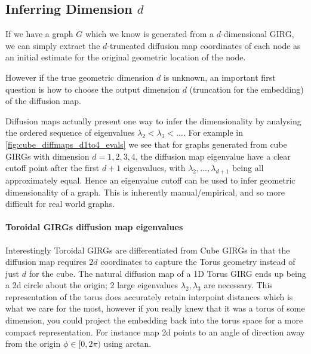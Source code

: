 \subsection{Inferring Dimension $d$}
If we have a graph $G$ which we know is generated from a $d$-dimensional GIRG, we can simply extract the $d$-truncated diffusion map coordinates of each node as an initial estimate for the original geometric location of the node. 

However if the true geometric dimension $d$ is unknown, an important first question is how to choose the output dimension $d$ (truncation for the embedding) of the diffusion map.

Diffusion maps actually present one way to infer the dimensionality by analysing the ordered sequence of eigenvalues $\lambda_2 < \lambda_3 < ...$. For example in \cref{fig:cube_diffmaps_d1to4_evals} we see that for graphs generated from cube GIRGs with dimension $d=1,2,3,4$, the diffusion map eigenvalue have a clear cutoff point after the first $d+1$ eigenvalues, with $\lambda_2, ..., \lambda_{d+1}$ being all approximately equal. Hence an eigenvalue cutoff can be used to infer geometric dimensionality of a graph. This is inherently manual/empirical, and so more difficult for real world graphs.

\paragraph{Toroidal GIRGs diffusion map eigenvalues} Interestingly Toroidal GIRGs are differentiated from Cube GIRGs in that the diffusion map requires $2d$ coordinates to capture the Torus geometry instead of just $d$ for the cube. The natural diffusion map of a 1D Torus GIRG ends up being a 2d circle about the origin; 2 large eigenvalues $\lambda_2, \lambda_3$ are necessary. This representation of the torus does accurately retain interpoint distances which is what we care for the most, however if you really knew that it was a torus of some dimension, you could project the embedding back into the torus space for a more compact representation. For instance \cite{garcia2019mercator} map 2d points to an angle of direction away from the origin $\phi \in [0, 2\pi)$ using arctan.





